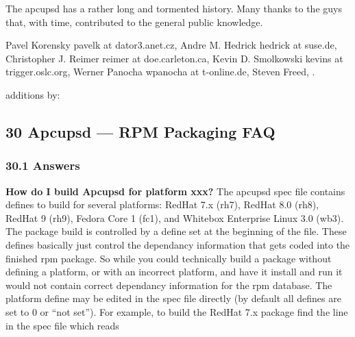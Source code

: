 {{{{{{{{{{{{{{{{{The apcupsd has a rather long and tormented history. Many thanks to the guys
that, with time, contributed to the general public knowledge.  

Pavel Korensky \lt{}pavelk at dator3.anet.cz\gt{}, Andre M. Hedrick
\lt{}hedrick at suse.de\gt{}, Christopher J. Reimer \lt{}reimer at
doe.carleton.ca\gt{}, Kevin D. Smolkowski \lt{}kevins at
trigger.oslc.org\gt{}, Werner Panocha \lt{}wpanocha at t-online.de\gt{},
Steven Freed, 
.  

additions by: 

\label{Apcupsd-_002d_002d-RPM-Packaging-FAQ}

\subsection*{30 Apcupsd {---} RPM Packaging FAQ}

\label{Answers}

\subsubsection*{30.1 Answers}

\begin{description}

\item {\bf {\bf How do I build Apcupsd for platform xxx?}}
The apcupsd spec file contains defines to build for several platforms: RedHat
7.x (rh7), RedHat 8.0 (rh8), RedHat 9 (rh9), Fedora Core 1 (fc1), and Whitebox
Enterprise Linux 3.0 (wb3).  The package build is controlled by a define set
at the beginning of the file. These defines basically just control the
dependancy information that gets coded into the finished rpm package.  So
while you could technically build a package without defining a platform, or
with an incorrect platform, and have it install and run it would not contain
correct dependancy information for the rpm database.  The platform define may
be edited in the spec file directly (by default all defines are set to 0 or
``not set'').  For example, to build the RedHat 7.x package find the line in
the spec file which reads  


\end{description}}}}}}}}}}}}}}}}}}
